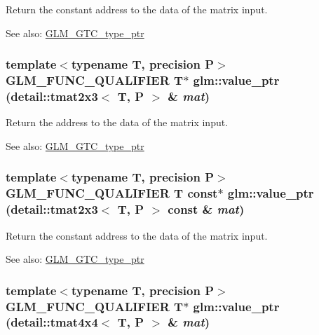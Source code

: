 Return the constant address to the data of the matrix input. \begin{Desc}
\item[See also:]\hyperlink{group__gtc__type__ptr}{GLM\_\-GTC\_\-type\_\-ptr} \end{Desc}
\hypertarget{group__gtc__type__ptr_g12dda3f2717411f15a1a317a82113f14}{
\subsubsection[value\_\-ptr]{\setlength{\rightskip}{0pt plus 5cm}template$<$typename T, precision P$>$ GLM\_\-FUNC\_\-QUALIFIER T$\ast$ glm::value\_\-ptr (detail::tmat2x3$<$ T, P $>$ \& {\em mat})}}
\label{group__gtc__type__ptr_g12dda3f2717411f15a1a317a82113f14}


Return the address to the data of the matrix input. \begin{Desc}
\item[See also:]\hyperlink{group__gtc__type__ptr}{GLM\_\-GTC\_\-type\_\-ptr} \end{Desc}
\hypertarget{group__gtc__type__ptr_g76ad4707fac9af56b7eaea2c9b6019fb}{
\subsubsection[value\_\-ptr]{\setlength{\rightskip}{0pt plus 5cm}template$<$typename T, precision P$>$ GLM\_\-FUNC\_\-QUALIFIER T const$\ast$ glm::value\_\-ptr (detail::tmat2x3$<$ T, P $>$ const \& {\em mat})}}
\label{group__gtc__type__ptr_g76ad4707fac9af56b7eaea2c9b6019fb}


Return the constant address to the data of the matrix input. \begin{Desc}
\item[See also:]\hyperlink{group__gtc__type__ptr}{GLM\_\-GTC\_\-type\_\-ptr} \end{Desc}
\hypertarget{group__gtc__type__ptr_g5f34b63d9c6322a3a61f15ee63768304}{
\subsubsection[value\_\-ptr]{\setlength{\rightskip}{0pt plus 5cm}template$<$typename T, precision P$>$ GLM\_\-FUNC\_\-QUALIFIER T$\ast$ glm::value\_\-ptr (detail::tmat4x4$<$ T, P $>$ \& {\em mat})}}
\label{group__gtc__type__ptr_g5f34b63d9c6322a3a61f15ee63768304}


